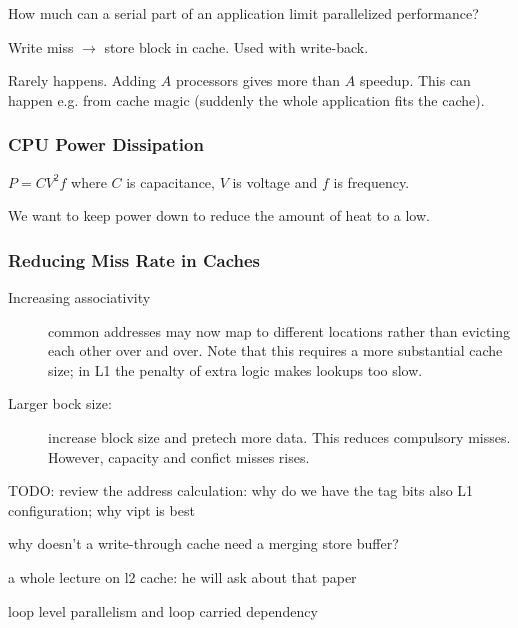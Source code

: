 \begin{definition}
    How much can a serial part of an application limit parallelized performance?
\end{definition}


\begin{definition}
    Write miss $\rightarrow$ store block in cache. Used with write-back.
\end{definition}



\begin{definition}
   Rarely happens. Adding $A$ processors gives more than $A$ speedup. This can happen e.g. from cache magic (suddenly the whole application fits the cache). 
\end{definition}


\subsubsection{CPU Power Dissipation}\label{sec:powerdissipation}
    $P = CV^{2}f$
    where $C$ is capacitance, $V$ is voltage and $f$ is frequency.

    We want to keep power down to reduce the amount of heat to a low.

\subsubsection{Reducing Miss Rate in Caches}
\begin{description}
    \item[Increasing associativity] common addresses may now map to different locations rather than evicting each other over and over. Note that this requires 
    a more substantial cache size; in L1 the penalty of extra logic makes lookups
    too slow.
    \item[Larger bock size:] increase block size and pretech more data. This
    reduces compulsory misses. However, capacity and confict misses rises.
\end{description}

TODO: review the address calculation: why do we have the tag bits
    also L1 configuration; why vipt is best

why doesn't a write-through cache need a merging store buffer?

a whole lecture on l2 cache: he will ask about that paper

loop level parallelism  and loop carried dependency
